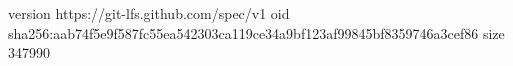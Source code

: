 version https://git-lfs.github.com/spec/v1
oid sha256:aab74f5e9f587fc55ea542303ca119ce34a9bf123af99845bf8359746a3cef86
size 347990
